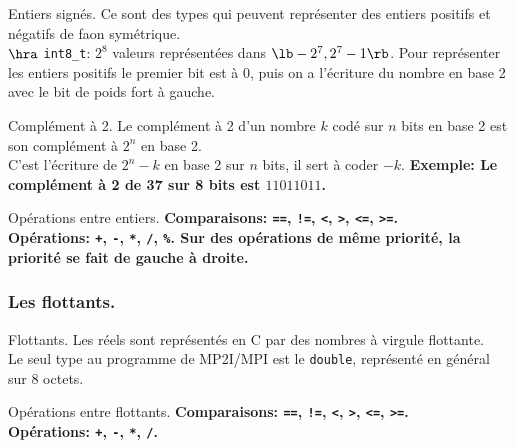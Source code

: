 \documentclass[french, 11pt]{article}
\begin{document}
\begin{defi}{Entiers signés.}{}
    Ce sont des types qui peuvent représenter des entiers positifs et négatifs de faon symétrique.\\
    $\hra$ \texttt{int8\_t}: $2^8$ valeurs représentées dans $\lb-2^7, 2^7-1\rb$.\n
    Pour représenter les entiers positifs le premier bit est à 0, puis on a l'écriture du nombre en base 2 avec le bit de poids fort à gauche.
\end{defi}

\vspace*{-0.5cm}

\begin{defi}{Complément à 2.}{}
    Le complément à 2 d'un nombre $k$ codé sur $n$ bits en base 2 est son complément à $2^n$ en base 2.\\
    C'est l'écriture de $2^n-k$ en base 2 sur $n$ bits, il sert à coder $-k$.\n
    \bf{Exemple:} Le complément à 2 de 37 sur 8 bits est $11011011$.
\end{defi}

\vspace*{-0.5cm}

\begin{defi}{Opérations entre entiers.}{}
    \bf{Comparaisons:} \texttt{==}, \texttt{!=}, \texttt{<}, \texttt{>}, \texttt{<=}, \texttt{>=}.\\
    \bf{Opérations:} \texttt{+}, \texttt{-}, \texttt{*}, \texttt{/}, \texttt{\%}.\n
    Sur des opérations de même priorité, la priorité se fait de gauche à droite.
\end{defi}

\subsubsection{Les flottants.}

\begin{defi}{Flottants.}{}
    Les réels sont représentés en C par des nombres à virgule flottante.\\
    Le seul type au programme de MP2I/MPI est le \texttt{double}, représenté en général sur 8 octets.
\end{defi}

\vspace*{-0.5cm}

\begin{defi}{Opérations entre flottants.}{}
    \bf{Comparaisons:} \texttt{==}, \texttt{!=}, \texttt{<}, \texttt{>}, \texttt{<=}, \texttt{>=}.\\
    \bf{Opérations:} \texttt{+}, \texttt{-}, \texttt{*}, \texttt{/}.
\end{defi}
\end{document}
